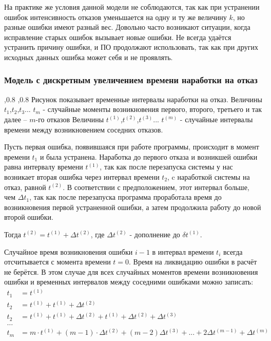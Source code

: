 \documentclass[a4paper, 12pt]{extarticle}
\begin{document}
 		На практике же условия данной модели не соблюдаются, так как при устранении ошибок интенсивность отказов уменьшается на одну и ту же величину $k$, но разные ошибки имеют разный вес. Довольно часто возникают ситуации, когда исправление старых ошибок вызывает новые ошибки. Не всегда удаётся устранить причину ошибки, и ПО продолжают использовать, так как при других исходных данных ошибка может себя и не проявлять.

	\subsubsection{	Модель с дискретным увеличением времени наработки на отказ}
	,0.8
	,0.8
	Рисунок показывает временные интервалы наработки на отказ.
	Величины $t_1$,$t_2$,$t_3$... $t_m$ - случайные моменты возникновения  первого, второго, третьего и так далее – $m$-го отказов
	Величины $t^{(1)}$,$t^{(2)}$,$t^{(3)}$... $t^{(m)}$ - случайные интервалы времени между возникновением соседних отказов.

	Пусть первая ошибка, появившаяся при работе программы, происходит в момент времени $t_1$ и была устранена. Наработка до первого отказа и возникшей ошибки равна интервалу времени $t^{(1)}$, так как после перезапуска системы у нас возникает вторая ошибка через интервал времени $t_2$, c наработкой системы на отказ, равной $t^{(2)}$. В соответствии с предположением, этот интервал больше, чем $\Delta t_1$, так как после перезапуска программа проработала время до возникновения первой устраненной ошибки, а затем продолжила работу до
новой второй ошибки.

	Тогда $t^{(2)}=t^{(1)}+\Delta t^{(2)}$, где $\Delta t^{(2)}$ - дополнение до $\delta t^{(1)}$.

	Случайное время возникновения ошибки $i-1$ в интервал времени $t_i$ всегда отсчитывается с момента времени $t=0$. Время на ликвидацию ошибки в расчёт не берётся. В этом случае для всех случайных моментов времени возникновения ошибки и временных интервалов между соседними ошибками можно записать:
\begin{align*}
	t_1 &= t^{(1)}\\
	t_2 &= t^{(1)} + t^{(1)} + \Delta t^{(2)}\\
	t_2 &= t^{(1)} + t^{(1)} + \Delta t^{(2)} + t^{(1)} + \Delta t^{(2)} +\Delta t^{(3)}\\
	\ldots &	\\
	t_m &= m \cdot t^{(1)} + (m-1)\cdot\Delta t^{(2)} + (m-2)\Delta t^{(3)} +... +2\Delta t^{(m-1)} +\Delta t^{(m)}
\end{align*}
\end{document}

